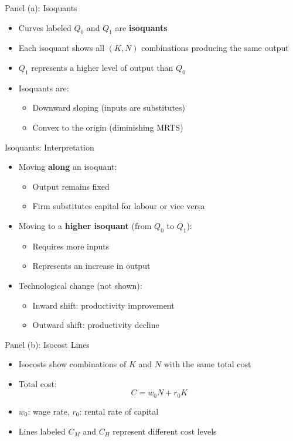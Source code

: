 \documentclass[aspectratio=169]{beamer}
\begin{document}

\begin{frame}{Panel (a): Isoquants}
\begin{itemize}
\item Curves labeled $Q_0$ and $Q_1$ are \textbf{isoquants}
\item Each isoquant shows all $(K,N)$ combinations producing the same output
\item $Q_1$ represents a higher level of output than $Q_0$
\item Isoquants are:
\begin{itemize}
\item Downward sloping (inputs are substitutes)
\item Convex to the origin (diminishing MRTS)
\end{itemize}
\end{itemize}
\end{frame}


\begin{frame}{Isoquants: Interpretation}
\begin{itemize}
\item Moving \textbf{along} an isoquant:
\begin{itemize}
\item Output remains fixed
\item Firm substitutes capital for labour or vice versa
\end{itemize}
\item Moving to a \textbf{higher isoquant} (from $Q_0$ to $Q_1$):
\begin{itemize}
\item Requires more inputs
\item Represents an increase in output
\end{itemize}
\item Technological change (not shown):
\begin{itemize}
\item Inward shift: productivity improvement
\item Outward shift: productivity decline
\end{itemize}
\end{itemize}
\end{frame}


\begin{frame}{Panel (b): Isocost Lines}
\begin{itemize}
\item Isocosts show combinations of $K$ and $N$ with the same total cost
\item Total cost:
\[
C = w_0 N + r_0 K
\]
\item $w_0$: wage rate, $r_0$: rental rate of capital
\item Lines labeled $C_M$ and $C_H$ represent different cost levels
\end{itemize}
\end{frame}
\end{document}
